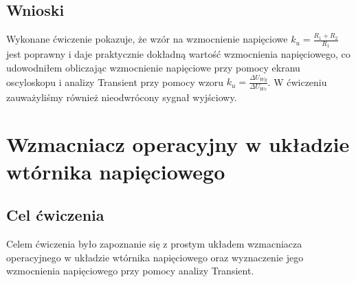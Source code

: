 \documentclass[11pt]{article}
\begin{document}
\subsection{Wnioski}
Wykonane ćwiczenie pokazuje, że wzór na wzmocnienie napięciowe $k_u=\frac{R_1+R_2}{R_1}$ jest poprawny i daje praktycznie dokładną wartość wzmocnienia napięciowego, co udowodniłem obliczając wzmocnienie napięciowe przy pomocy ekranu oscyloskopu i analizy Transient przy pomocy wzoru  $k_u=\frac{{\Delta}U_{Wy}}{{\Delta}U_{We}}$. W ćwiczeniu zauważyliśmy również nieodwrócony sygnał wyjściowy.
\section{Wzmacniacz operacyjny w układzie wtórnika napięciowego}
\subsection{Cel ćwiczenia}
Celem ćwiczenia było zapoznanie się z prostym układem wzmacniacza operacyjnego w układzie wtórnika napięciowego oraz wyznaczenie jego wzmocnienia napięciowego przy pomocy analizy Transient.
\end{document}
